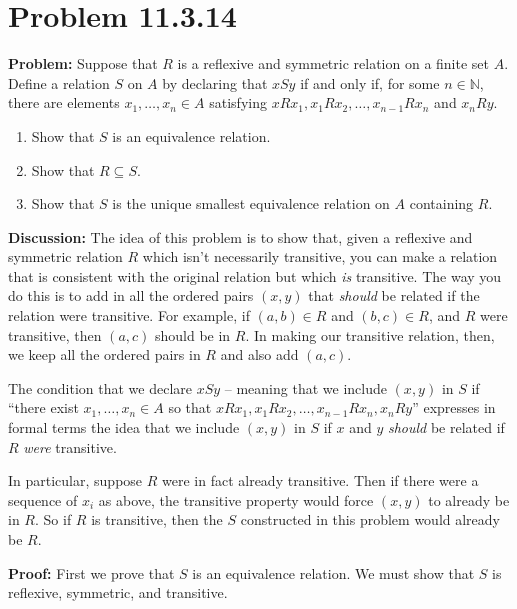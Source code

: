 \documentclass[
]{article}
\author{}
\date{}
\providecommand{\tightlist}{%
  \setlength{\itemsep}{0pt}\setlength{\parskip}{0pt}}
\begin{document}
\hypertarget{problem-11.3.14}{%
\section{Problem 11.3.14}\label{problem-11.3.14}}

\renewcommand{\subset}{\subseteq}

\textbf{Problem:} Suppose that \(R\) is a reflexive and symmetric
relation on a finite set \(A\). Define a relation \(S\) on \(A\) by
declaring that \(xSy\) if and only if, for some \(n\in\mathbb{N}\),
there are elements \(x_1,\ldots, x_n\in A\) satisfying
\(xRx_1,x_1Rx_2,\ldots, x_{n-1}Rx_{n}\) and \(x_{n}Ry\).

\begin{enumerate}
\def\labelenumi{\arabic{enumi}.}
\tightlist
\item
  Show that \(S\) is an equivalence relation.
\item
  Show that \(R\subseteq S\).
\item
  Show that \(S\) is the unique smallest equivalence relation on \(A\)
  containing \(R\).
\end{enumerate}

\textbf{Discussion:} The idea of this problem is to show that, given a
reflexive and symmetric relation \(R\) which isn't necessarily
transitive, you can make a relation that is consistent with the original
relation but which \emph{is} transitive. The way you do this is to add
in all the ordered pairs \((x,y)\) that \emph{should} be related if the
relation were transitive. For example, if \((a,b)\in R\) and
\((b,c)\in R\), and \(R\) were transitive, then \((a,c)\) should be in
\(R\). In making our transitive relation, then, we keep all the ordered
pairs in \(R\) and also add \((a,c)\).

The condition that we declare \(xSy\) -- meaning that we include
\((x,y)\) in \(S\) if ``there exist \(x_1,\ldots, x_n\in A\) so that
\(xRx_1, x_1Rx_2,\ldots,x_{n-1}Rx_{n},x_{n}Ry\)'' expresses in formal
terms the idea that we include \((x,y)\) in \(S\) if \(x\) and \(y\)
\emph{should} be related if \(R\) \emph{were} transitive.

In particular, suppose \(R\) were in fact already transitive. Then if
there were a sequence of \(x_i\) as above, the transitive property would
force \((x,y)\) to already be in \(R\). So if \(R\) is transitive, then
the \(S\) constructed in this problem would already be \(R\).

\textbf{Proof:} First we prove that \(S\) is an equivalence relation. We
must show that \(S\) is reflexive, symmetric, and transitive.
\end{document}
